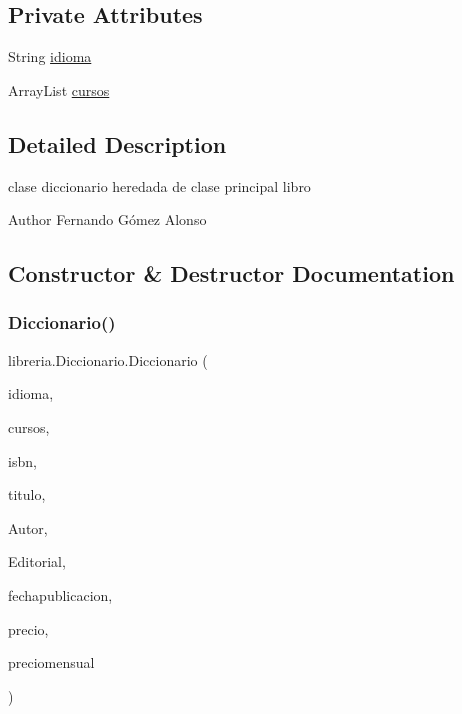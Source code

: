 \subsection*{Private Attributes}
\begin{DoxyCompactItemize}
\item 
String \mbox{\hyperlink{classlibreria_1_1_diccionario_ab5efd7c7392d8c91283d0c5270408d70}{idioma}}
\item 
Array\+List \mbox{\hyperlink{classlibreria_1_1_diccionario_a192b58fb0f0773bc0f857c0481a507c5}{cursos}}
\end{DoxyCompactItemize}


\subsection{Detailed Description}
clase diccionario heredada de clase principal libro \begin{DoxyAuthor}{Author}
Fernando Gómez Alonso 
\end{DoxyAuthor}


\subsection{Constructor \& Destructor Documentation}
\mbox{\label{classlibreria_1_1_diccionario_adf99514425c525126dc07f482c2f834d}} 
\subsubsection{\texorpdfstring{Diccionario()}{Diccionario()}}
{\footnotesize\ttfamily libreria.\+Diccionario.\+Diccionario (\begin{DoxyParamCaption}\item[{String}]{idioma,  }\item[{Array\+List}]{cursos,  }\item[{String}]{isbn,  }\item[{String}]{titulo,  }\item[{String}]{Autor,  }\item[{String}]{Editorial,  }\item[{String \mbox{[}$\,$\mbox{]}}]{fechapublicacion,  }\item[{float}]{precio,  }\item[{float}]{preciomensual }\end{DoxyParamCaption})\hspace{0.3cm}{\ttfamily [inline]}}

